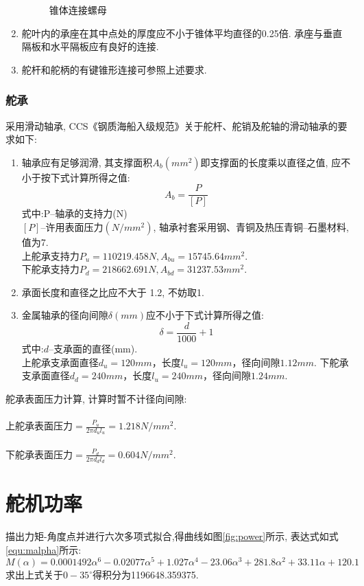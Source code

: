 \documentclass[a4paper,UTF8]{article}
\begin{document}
\begin{enumerate}
\begin{figure}
			\caption{锥体连接螺母}
			\label{fig:nut}
		\end{figure}
	\item 舵叶内的承座在其中点处的厚度应不小于锥体平均直径的0.25倍. 承座与垂直隔板和水平隔板应有良好的连接.
	\item 舵杆和舵柄的有键锥形连接可参照上述要求.
\end{enumerate}

\subsubsection{舵承}
	采用滑动轴承, CCS《钢质海船入级规范》关于舵杆、舵销及舵轴的滑动轴承的要求如下:
	\begin{enumerate}
		\item 轴承应有足够润滑, 其支撑面积$A_{b}(mm^2)$即支撑面的长度乘以直径之值, 应不小于按下式计算所得之值:
		\begin{equation}
			A_{b}=\frac{P}{[P]}
		\end{equation}
		式中:P--轴承的支持力(N)\\
		$[P]$--许用表面压力$(N/mm^2)$, 轴承衬套采用钢、青铜及热压青铜--石墨材料, 值为7.\\
		上舵承支持力$P_{u}=110219.458N, A_{bu}=15745.64mm^2$.\\
		下舵承支持力$P_{d}=218662.691N, A_{bd}=31237.53mm^2$.
		\item 承面长度和直径之比应不大于 1.2, 不妨取1.
		\item 金属轴承的径向间隙$\delta(mm)$应不小于下式计算所得之值:
		\begin{equation}
			\delta=\frac{d}{1000}+1
		\end{equation}
		式中:$d$--支承面的直径(mm).\\
		上舵承支承面直径$d_{u}=120mm$，长度$l_{u}=120mm$，径向间隙$1.12mm$.
		下舵承支承面直径$d_{d}=240mm$，长度$l_{u}=240mm$，径向间隙$1.24mm$.
	\end{enumerate}
	舵承表面压力计算, 计算时暂不计径向间隙:\\ \\
上舵承表面压力$=\frac{P_{u}}{2\pi d_{u}l_{u}}=1.218N/mm^2$.\\ \\
下舵承表面压力$=\frac{P_{d}}{2\pi d_{d}l_{d}}=0.604N/mm^2$.\\
\section{舵机功率}
描出力矩-角度点并进行六次多项式拟合,得曲线如图\ref{fig:power}所示, 表达式如式\ref{equ:malpha}所示:
\begin{equation}\label{equ:malpha}
	M(\alpha)=0.0001492\alpha^6 - 0.02077\alpha^5 + 1.027\alpha^4 - 23.06\alpha^3 + 281.8\alpha^2 + 33.11\alpha + 120.1
\end{equation}
求出上式关于$0-35^{\circ}$得积分为1196648.359375.\\
\end{document}
